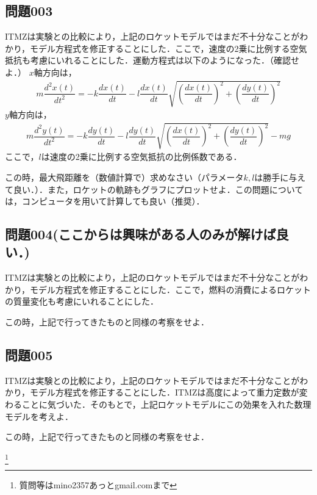 \documentclass[12pt]{jarticle}
\begin{document}
\subsection*{問題003}
ITMZは実験との比較により，上記のロケットモデルではまだ不十分なことがわかり，モデル方程式を修正することにした．ここで，速度の2乗に比例する空気抵抗も考慮にいれることにした．運動方程式は以下のようになった．（確認せよ．）
$x$軸方向は，
\begin{align*}
m \dfrac{d^2 x(t)}{dt^2} = - k \dfrac{dx(t)}{dt} - l \dfrac{dx(t)}{dt} \sqrt{ \left( \dfrac{dx(t)}{dt} \right)^2 + \left( \dfrac{dy(t)}{dt} \right)^2 } 
\end{align*}
$y$軸方向は，
\begin{align*}
m \dfrac{d^2 y(t)}{dt^2} = - k \dfrac{dy(t)}{dt} -  l \dfrac{dy(t)}{dt} \sqrt{ \left( \dfrac{dx(t)}{dt} \right)^2 + \left( \dfrac{dy(t)}{dt} \right)^2 } - mg
\end{align*}
ここで，$l$は速度の2乗に比例する空気抵抗の比例係数である．

この時，最大飛距離を（数値計算で）求めなさい（パラメータ$k, l$は勝手に与えて良い．）．また，ロケットの軌跡もグラフにプロットせよ．この問題については，コンピュータを用いて計算しても良い（推奨）．
%
\subsection*{問題004(ここからは興味がある人のみが解けば良い．)}
ITMZは実験との比較により，上記のロケットモデルではまだ不十分なことがわかり，モデル方程式を修正することにした．ここで，燃料の消費によるロケットの質量変化も考慮にいれることにした．

この時，上記で行ってきたものと同様の考察をせよ．
%
\subsection*{問題005}
ITMZは実験との比較により，上記のロケットモデルではまだ不十分なことがわかり，モデル方程式を修正することにした．ITMZは高度によって重力定数が変わることに気づいた．そのもとで，上記ロケットモデルにこの効果を入れた数理モデルを考えよ．

この時，上記で行ってきたものと同様の考察をせよ．


\footnote[0]{
質問等はmino2357あっとgmail.comまで
}

\thispagestyle{empty}
\end{document}
